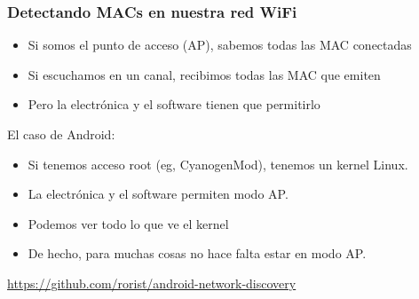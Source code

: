 \begin{frame}
\frametitle{Detectando MACs en nuestra red WiFi}

{\Large

\begin{itemize}
\item Si somos el punto de acceso (AP), sabemos todas las MAC conectadas
\item Si escuchamos en un canal, recibimos todas las MAC que emiten
\item Pero la electrónica y el software tienen que permitirlo
\end{itemize}
}

El caso de Android:

\begin{itemize}
\item Si tenemos acceso root (eg, CyanogenMod), tenemos un kernel Linux.
\item La electrónica y el software permiten modo AP.
\item Podemos ver todo lo que ve el kernel
\item De hecho, para muchas cosas no hace falta estar en modo AP.
\end{itemize}

\begin{flushright}
{\small
  \url{https://github.com/rorist/android-network-discovery}
}
\end{flushright}
\end{frame}
